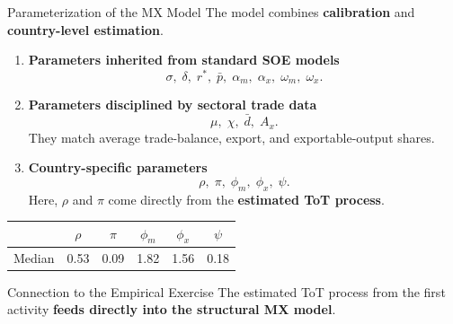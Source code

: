 \documentclass[10pt]{beamer}
\begin{document}
\begin{frame}{Parameterization of the MX Model}
\small
The model combines \textbf{calibration} and \textbf{country-level estimation}.
\vspace{0.1cm}
\begin{enumerate}
    \item \textbf{Parameters inherited from standard SOE models}
    \[
    \sigma,\;\delta,\;r^*,\;\bar p,\;\alpha_m,\;\alpha_x,\;\omega_m,\;\omega_x.
    \]
    \item \textbf{Parameters disciplined by sectoral trade data}
    \[
    \mu,\;\chi,\;\bar d,\;A_x.
    \]
    They match average trade-balance, export, and exportable-output shares.
    \item \textbf{Country-specific parameters}
    \[
    \rho,\;\pi,\;\phi_m,\;\phi_x,\;\psi.
    \]
    Here, $\rho$ and $\pi$ come directly from the
    \textbf{estimated ToT process}.
\end{enumerate}
\vspace{0.15cm}
\begin{center}
\begin{tabular}{lccccc}
\toprule
 & $\rho$ & $\pi$ & $\phi_m$ & $\phi_x$ & $\psi$ \\
\midrule
Median & 0.53 & 0.09 & 1.82 & 1.56 & 0.18 \\
\bottomrule
\end{tabular}
\end{center}
\vspace{0.1cm}
\begin{block}{Connection to the Empirical Exercise}
\centering
The estimated ToT process from the first activity
\textbf{feeds directly into the structural MX model}.
\end{block}
\end{frame}
\end{document}
